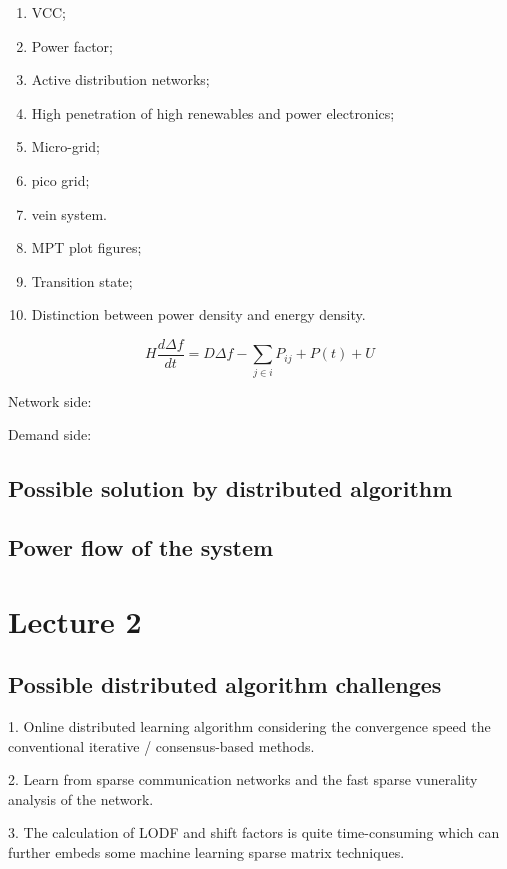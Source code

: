 \documentclass{article}
\begin{document}
\begin{enumerate}
  \item VCC;
  \item Power factor;
  \item Active distribution networks;
  \item High penetration of high renewables and power electronics;
  \item Micro-grid; 
  \item pico grid;
  \item vein system.
  \item MPT plot figures;
  \item Transition state;
  \item Distinction between power density and energy density.
\end{enumerate}

$$
H \frac{d \Delta f}{d t} = D \Delta f  - \sum_{j\in i} P_{ij} + P(t) + U 
$$

Network side:

Demand side: 


\subsection{Possible solution by distributed algorithm}

\subsection{Power flow of the system}

\newpage

\section{Lecture 2}

\subsection{Possible distributed algorithm challenges}

1. Online distributed learning algorithm considering the convergence speed the conventional iterative / consensus-based methods.

2. Learn from sparse communication networks and the fast sparse vunerality analysis of the network. 

3. The calculation of LODF and shift factors is quite time-consuming which can further embeds some machine learning sparse matrix techniques.
\end{document}
